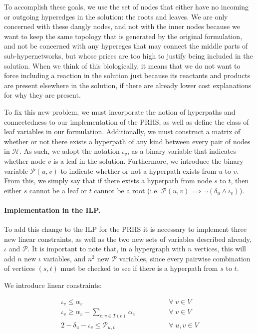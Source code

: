 \documentclass[12pt,twoside]{reedthesis}
\theoremstyle{definition}
\begin{document}
To accomplish these goals, we use the set of nodes that either have no incoming or outgoing hyperedges in the solution: the roots and leaves. We are only concerned with these dangly nodes, and not with the inner nodes because we want to keep the same topology that is generated by the original formulation, and not be concerned with any hypereges that may connect the middle parts of sub-hypernetworks, but whose prices are too high to justify being included in the solution. When we think of this biologically, it means that we do not want to force including a reaction in the solution just because its reactants and products are present elsewhere in the solution, if there are already lower cost explanations for why they are present.\par

To fix this new problem, we must incorporate the notion of hyperpaths and connectedness to our implementation of the PRHS, as well as define the class of leaf variables in our formulation. Additionally, we must construct a matrix of whether or not there exists a hyperpath of any kind between every pair of nodes in $\mathcal{H}$. As such, we adopt the notation $\iota_v$, as a binary variable that indicates whether node $v$ is a leaf in the solution. Furthermore, we introduce the binary variable $\mathcal{P}(u,v)$ to indicate whether or not a hyperpath exists from $u$ to $v$. From this, we simply say that if there exists a hyperpath from node $s$ to $t$, then either $s$ cannot be a leaf or $t$ cannot be a root (i.e. $\mathcal{P}(u,v)\implies\neg(\delta_u\wedge\iota_v)$).\par

\paragraph{Implementation in the ILP.}To add this change to the ILP for the PRHS it is necessary to implement three new linear constraints, as well as the two new sets of variables described already, $\iota$ and $\mathcal{P}$. It is important to note that, in a hypergraph with $n$ vertices, this will add $n$ new $\iota$ variables, and $n^2$ new $\mathcal{P}$ variables, since every pairwise combination of vertices $(s,t)$ must be checked to see if there is a hyperpath from $s$ to $t$.

We introduce linear constraints:

\begin{align}
 \iota_v \leq \alpha_v \qquad\qquad &\forall\; v \in V\label{eq:dc1}\\
 \iota_v \geq \alpha_{v} - \sum_{e:v \in T(e)} \alpha_e \qquad\qquad &\forall\; v \in V\label{eq:dc2}\\
 2 - \delta_u - \iota_v \leq \mathcal{P}_{u,v} \qquad\qquad &\forall\; u,v \in V\label{eq:dc3}%
\end{align}%
\end{document}
